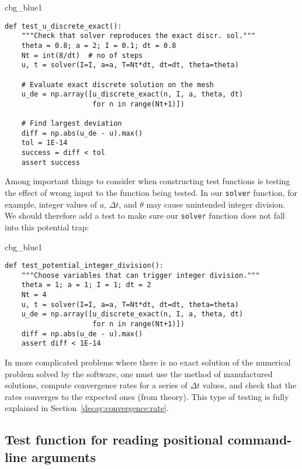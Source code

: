 \documentclass[graybox,sectrefs,envcountresetchap,open=right,final]{svmonodo}
\newenvironment{_cod_tight}[1]{
   \def\FrameCommand{\colorbox{#1}}
   \FrameRule0.6pt\MakeFramed {\FrameRestore}\vskip3mm}
   {\vskip0mm\endMakeFramed}
\newenvironment{cod}[1]{
\bgroup\rmfamily
\fboxsep=0mm\relax
\begin{_cod_tight}{#1}
\list{}{\parsep=-2mm\parskip=0mm\topsep=0pt\leftmargin=2mm
\rightmargin=2\leftmargin\leftmargin=4pt\relax}
\item\relax}
{\endlist\end{_cod_tight}\egroup}
\begin{document}
\begin{cod}{cbg_blue1}\begin{Verbatim}[numbers=none,fontsize=\fontsize{9pt}{9pt},baselinestretch=0.95,xleftmargin=2mm]
def test_u_discrete_exact():
    """Check that solver reproduces the exact discr. sol."""
    theta = 0.8; a = 2; I = 0.1; dt = 0.8
    Nt = int(8/dt)  # no of steps
    u, t = solver(I=I, a=a, T=Nt*dt, dt=dt, theta=theta)

    # Evaluate exact discrete solution on the mesh
    u_de = np.array([u_discrete_exact(n, I, a, theta, dt)
                     for n in range(Nt+1)])

    # Find largest deviation
    diff = np.abs(u_de - u).max()
    tol = 1E-14
    success = diff < tol
    assert success
\end{Verbatim}
\end{cod}
\noindent

Among important things to consider when constructing test functions
is testing the effect of wrong input to the function being tested.
In our \texttt{solver} function, for example, integer values of $a$, $\Delta t$, and
$\theta$ may cause unintended integer
division. We should therefore add a test to make sure our \texttt{solver}
function does not fall into this potential trap:

\begin{cod}{cbg_blue1}\begin{Verbatim}[numbers=none,fontsize=\fontsize{9pt}{9pt},baselinestretch=0.95,xleftmargin=2mm]
def test_potential_integer_division():
    """Choose variables that can trigger integer division."""
    theta = 1; a = 1; I = 1; dt = 2
    Nt = 4
    u, t = solver(I=I, a=a, T=Nt*dt, dt=dt, theta=theta)
    u_de = np.array([u_discrete_exact(n, I, a, theta, dt)
                     for n in range(Nt+1)])
    diff = np.abs(u_de - u).max()
    assert diff < 1E-14
\end{Verbatim}
\end{cod}
\noindent

In more complicated problems where there is no exact solution of the
numerical problem solved by the software, one must use the method
of manufactured solutions, compute convergence rates for a series
of $\Delta t$ values, and check that the rates converges to the
expected ones (from theory).
This type of testing is fully explained in
Section~\ref{decay:convergence:rate}.

\subsection{Test function for reading positional command-line arguments}
\end{document}
